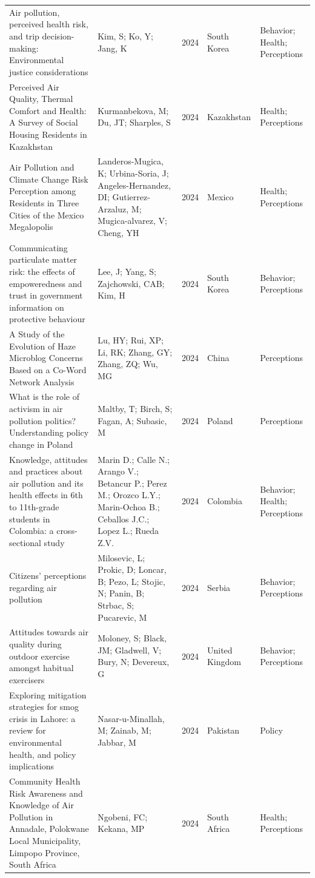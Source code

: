 {\begin{longtable}[t]{p{6cm}p{3cm}lp{3cm}p{3cm}}
Air pollution, perceived health risk, and trip decision-making: Environmental justice considerations & Kim, S; Ko, Y; Jang, K & 2024 & South Korea & Behavior; Health; Perceptions\\
Perceived Air Quality, Thermal Comfort and Health: A Survey of Social Housing Residents in Kazakhstan & Kurmanbekova, M; Du, JT; Sharples, S & 2024 & Kazakhstan & Health; Perceptions\\
Air Pollution and Climate Change Risk Perception among Residents in Three Cities of the Mexico Megalopolis & Landeros-Mugica, K; Urbina-Soria, J; Angeles-Hernandez, DI; Gutierrez-Arzaluz, M; Mugica-alvarez, V; Cheng, YH & 2024 & Mexico & Health; Perceptions\\
Communicating particulate matter risk: the effects of empoweredness and trust in government information on protective behaviour & Lee, J; Yang, S; Zajchowski, CAB; Kim, H & 2024 & South Korea & Behavior; Perceptions\\
A Study of the Evolution of Haze Microblog Concerns Based on a Co-Word Network Analysis & Lu, HY; Rui, XP; Li, RK; Zhang, GY; Zhang, ZQ; Wu, MG & 2024 & China & Perceptions\\
\addlinespace
What is the role of activism in air pollution politics? Understanding policy change in Poland & Maltby, T; Birch, S; Fagan, A; Subasic, M & 2024 & Poland & Perceptions\\
Knowledge, attitudes and practices about air pollution and its health effects in 6th to 11th-grade students in Colombia: a cross-sectional study & Marin D.; Calle N.; Arango V.; Betancur P.; Perez M.; Orozco L.Y.; Marin-Ochoa B.; Ceballos J.C.; Lopez L.; Rueda Z.V. & 2024 & Colombia & Behavior; Health; Perceptions\\
Citizens' perceptions regarding air pollution & Milosevic, L; Prokic, D; Loncar, B; Pezo, L; Stojic, N; Panin, B; Strbac, S; Pucarevic, M & 2024 & Serbia & Behavior; Perceptions\\
Attitudes towards air quality during outdoor exercise amongst habitual exercisers & Moloney, S; Black, JM; Gladwell, V; Bury, N; Devereux, G & 2024 & United Kingdom & Behavior; Perceptions\\
Exploring mitigation strategies for smog crisis in Lahore: a review for environmental health, and policy implications & Nasar-u-Minallah, M; Zainab, M; Jabbar, M & 2024 & Pakistan & Policy\\
\addlinespace
Community Health Risk Awareness and Knowledge of Air Pollution in Annadale, Polokwane Local Municipality, Limpopo Province, South Africa & Ngobeni, FC; Kekana, MP & 2024 & South Africa & Health; Perceptions\\

\end{longtable}}
